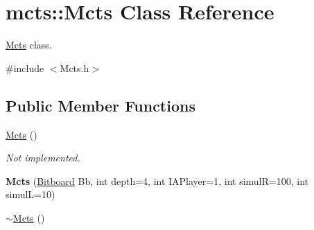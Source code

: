 \hypertarget{classmcts_1_1_mcts}{\section{mcts\+:\+:Mcts Class Reference}
\label{classmcts_1_1_mcts}
}


\hyperlink{classmcts_1_1_mcts}{Mcts} class.  




{\ttfamily \#include $<$Mcts.\+h$>$}

\subsection*{Public Member Functions}
\begin{DoxyCompactItemize}
\item 
\hyperlink{classmcts_1_1_mcts_ad02b46adb483edd120569db71cb4d3f7}{Mcts} ()
\begin{DoxyCompactList}\small\item\em Not implemented. \end{DoxyCompactList}\item 
\hypertarget{classmcts_1_1_mcts_a66cebd7955bee63b0312658782172fb1}{{\bfseries Mcts} (\hyperlink{class_bitboard}{Bitboard} Bb, int depth=4, int I\+A\+Player=1, int simul\+R=100, int simul\+L=10)}\label{classmcts_1_1_mcts_a66cebd7955bee63b0312658782172fb1}

\item 
\hypertarget{classmcts_1_1_mcts_afb758831416d24b400def54eeda53122}{\hyperlink{classmcts_1_1_mcts_afb758831416d24b400def54eeda53122}{$\sim$\+Mcts} ()}\label{classmcts_1_1_mcts_afb758831416d24b400def54eeda53122}


\end{DoxyCompactItemize}
